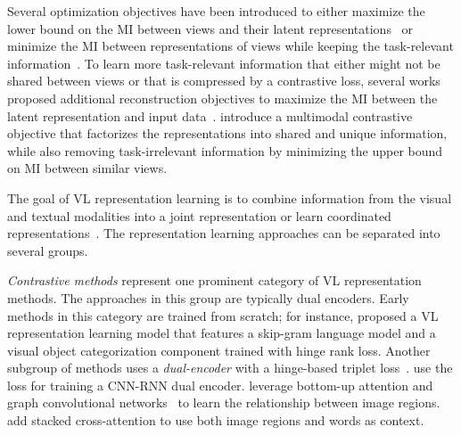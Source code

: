 Several optimization objectives have been introduced to either maximize the lower bound on the \ac{MI} between views and their latent representations~\citep{oord2018representation, bachman2019learning, hjelm2019learning, tian2020contrastive} or minimize the \ac{MI} between representations of views while keeping the task-relevant information~\citep{federici2020learning, lee2021compressive}.
To learn more task-relevant information that either might not be shared between views or that is compressed by a contrastive loss, several works proposed additional reconstruction objectives to maximize the \ac{MI} between the latent representation and input data~\citep{tsai2021self, wang2022rethinking, li2023addressing, bleeker2023reducing}.
\cite{liang2023factorized} introduce a multimodal contrastive objective that factorizes the representations into shared and unique information, while also removing task-irrelevant information by minimizing the upper bound on \ac{MI} between similar views.

The goal of \ac{VL} representation learning is to combine information from the visual and textual modalities into a joint representation or learn coordinated representations~\citep{baltrusaitis2019_multimodal, guo2019_deep}.
The representation learning approaches can be separated into several groups.

\emph{Contrastive methods} represent one prominent category of \ac{VL} representation methods. 
The approaches in this group are typically dual encoders.
Early methods in this category are trained from scratch; for instance, \citep{frome2013devise} proposed a \ac{VL} representation learning model that features a skip-gram language model and a visual object categorization component trained with hinge rank loss. 
Another subgroup of methods uses a \emph{dual-encoder} with a hinge-based triplet loss~\citep{kiros2014unifying, li2019visual, lee2018stacked}.
\cite{kiros2014unifying} use the loss for training a CNN-RNN dual encoder. 
\citet{li2019visual} leverage bottom-up attention and graph convolutional networks~\citep{kipf2017_semi} to learn the relationship between image regions. 
\cite{lee2018stacked} add stacked cross-attention to use both image regions and words as context.

